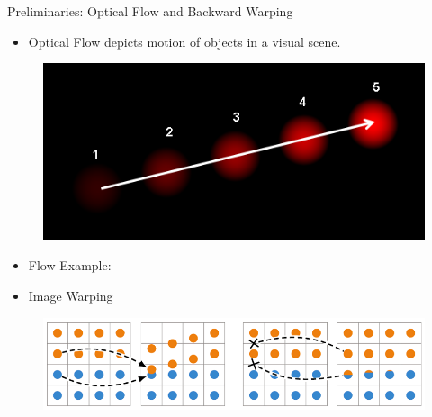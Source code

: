 \documentclass[aspectratio=43]{beamer}
\begin{document}
	\begin{frame}{Preliminaries: Optical Flow and Backward Warping}
		\begin{itemize}
			\item Optical Flow depicts \alert{motion} of objects in a visual scene.
		\end{itemize}
		\begin{figure}
			\centering\includegraphics[width=0.4\linewidth]{images/Optical_flow_example.png}
		\end{figure}
		\begin{itemize}
			\item Flow Example:
		\end{itemize}
		\begin{figure}
			\centering
		\end{figure}
		\begin{itemize}
			\item Image Warping
		\end{itemize}
		\begin{figure}
			\centering\includegraphics[width=0.6\linewidth]{images/warping.png}
		\end{figure}
	\end{frame}
\end{document}
